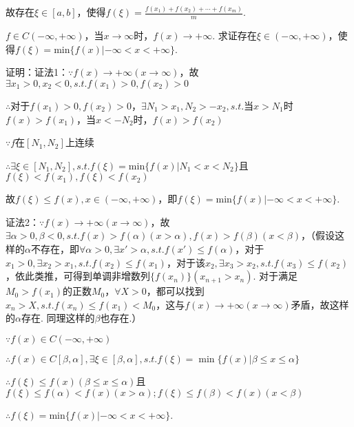 \documentclass[12pt,UTF8]{ctexart}
\begin{document}
\begin{enumerate}
故存在$\xi\in[a,b]$，使得$f(\xi)=\frac{f(x_1)+f(x_2)+\cdots+f(x_m)}m.$

$f\in C(-\infty,+\infty)$，当$x\rightarrow\infty$时，$f(x)\rightarrow+\infty$. 求证存在$\xi\in(-\infty,+\infty)$，使得$f(\xi)=\text{min}\{f(x)|-\infty<x<+\infty\}$.

证明：证法1：$\because f(x)\rightarrow+\infty(x\rightarrow\infty)$，故$\exists x_1>0,x_2<0,s.t.f(x_1)>0,f(x_2)>0$

$\therefore$对于$f(x_1)>0,f(x_2)>0$，$\exists N_1>x_1,N_2>-x_2,s.t.$当$x>N_1$时$f(x)>f(x_1)$，当$x<-N_2$时，$f(x)>f(x_2)$

$\because f$在$[N_1,N_2]$上连续

$\therefore\exists\xi\in[N_1,N_2],s.t.f(\xi)=\text{min}\{f(x)|N_1<x<N_2\}$且$f(\xi)<f(x_1),f(\xi)<f(x_2)$

故$f(\xi)\leq f(x),x\in(-\infty,+\infty)$，即$f(\xi)=\text{min}\{f(x)|-\infty<x<+\infty\}$.

证法2：$\because f(x)\rightarrow+\infty(x\rightarrow\infty)$，故$\exists\alpha>0,\beta<0,s.t.f(x)>f(\alpha)(x>\alpha),f(x)>f(\beta)(x<\beta)$，（假设这样的$\alpha$不存在，即$\forall\alpha>0,\exists x'>\alpha,s.t.f(x')\leq f(\alpha)$，对于$x_1>0,\exists x_2>x_1,s.t.f(x_2)\leq f(x_1)$，对于该$x_2,\exists x_3>x_2,s.t.f(x_3)\leq f(x_2)$，依此类推，可得到单调非增数列$\{f(x_n)\}(x_{n+1}>x_n)$. 对于满足$M_0>f(x_1)$的正数$M_0$，$\forall X>0$，都可以找到$x_n>X,s.t.f(x_n)\leq f(x_1)<M_0$，这与$f(x)\rightarrow+\infty(x\rightarrow\infty)$矛盾，故这样的$\alpha$存在. 同理这样的$\beta$也存在.）

$\because f(x)\in C(-\infty,+\infty)$

$\therefore f(x)\in C[\beta,\alpha],\exists\xi\in[\beta,\alpha],s.t.f(\xi)=\min\{f(x)|\beta\leq x\leq\alpha\}$

$\therefore f(\xi)\leq f(x)(\beta\leq x\leq\alpha)$且$f(\xi)\leq f(\alpha)<f(x)(x>\alpha);f(\xi)\leq f(\beta)<f(x)(x<\beta)$

$\therefore f(\xi)=\text{min}\{f(x)|-\infty<x<+\infty\}$.
\end{enumerate}
\end{document}
